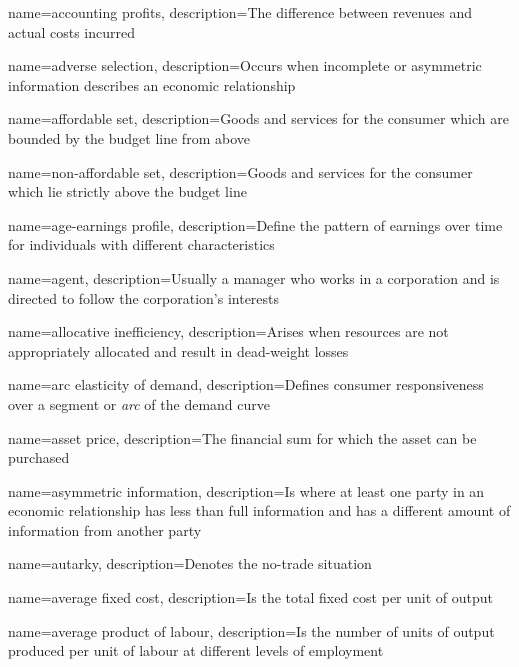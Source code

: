 {
	name={accounting profits},
	description={The difference between revenues and actual costs incurred}
}

{
	name={adverse selection},
	description={Occurs when incomplete or asymmetric information describes an economic relationship}
}

{
	name={affordable set},
	description={Goods and services for the consumer which are bounded by the budget line from above}
}

{
	name={non-affordable set},
	description={Goods and services for the consumer which lie strictly above the budget line}
}

{
	name={age-earnings profile},
	description={Define the pattern of earnings over time for individuals with different characteristics}
}

{
	name={agent},
	description={Usually a manager who works in a corporation and is directed to follow the corporation's
interests}
}

{
	name={allocative inefficiency},
	description={Arises when resources are not appropriately allocated and result in dead-weight losses}
}

{
	name={arc elasticity of demand},
	description={Defines consumer responsiveness over a segment or \emph{arc} of the demand curve}
}

{
	name={asset price},
	description={The financial sum for which the asset can be purchased}
}

{
	name={asymmetric information},
	description={Is where at least one party in an economic relationship has less than full information and has a different amount of information from another party}
}

{
	name={autarky},
	description={Denotes the no-trade situation}
}

{
	name={average fixed cost},
	description={Is the total fixed cost per unit of output}
}

{
	name={average product of labour},
	description={Is the number of units of output produced per unit of labour at different levels of employment}
}

